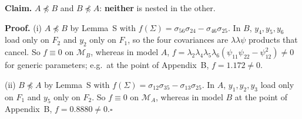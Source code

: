 \documentclass[10pt,a4paper]{article}
\newcommand{\nnest}{\not\preceq}
\begin{document}
\noindent\textbf{Claim.} $A \nnest B$ and $B \nnest A$: \textbf{neither} is nested in the other.\par\smallskip
\noindent\textbf{Proof.} (i) $A\nnest B$ by Lemma~S with $f(\Sigma)=\sigma_{56}\sigma_{24} - \sigma_{46}\sigma_{25}$. In $B$, $y_4,y_5,y_6$ load only on $F_2$ and $y_2$ only on $F_1$, so the four covariances are $\lambda\lambda\psi$ products that cancel. So $f\equiv0$ on $\mathcal M_B$, whereas in model $A$, $f=\lambda_2\lambda_4\lambda_5\lambda_6(\psi_{11}\psi_{22}-\psi_{12}^2)\neq0$ for generic parameters; e.g.\ at the point of Appendix~B, $f=1.172\neq0$.\par\smallskip
\noindent(ii) $B\nnest A$ by Lemma~S with $f(\Sigma)=\sigma_{12}\sigma_{35} - \sigma_{13}\sigma_{25}$. In $A$, $y_1,y_2,y_3$ load only on $F_1$ and $y_5$ only on $F_2$. So $f\equiv0$ on $\mathcal M_A$, whereas in model $B$ at the point of Appendix~B, $f=0.8880\neq0$.\hfill$\square$\par\medskip
{}

\clearpage
\end{document}
